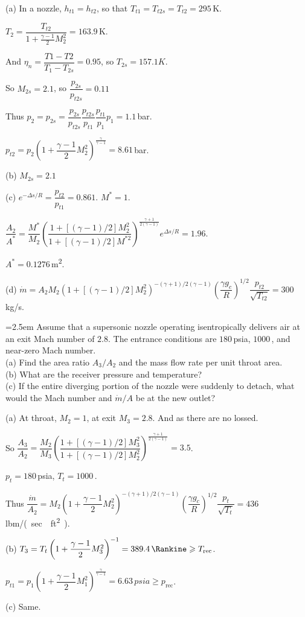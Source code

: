 \documentclass[12pt]{article}
\newlength{\questionlabelwidth}
\newcommand{\question}[2]{%
  \par\noindent
  {\hangindent=2.5em %
   \hangafter=1 %
   \makebox[\questionlabelwidth][l]{\textbf{#1}}#2\par}%
}
\begin{document}
\begin{answerbox}
(a) In a nozzle, $h_{t1}=h_{t2}$, so that $T_{t1}=T_{t2s}=T_{t2}=295$\,\si{K}.

$T_2=\dfrac{T_{t2}}{1+\frac{\gamma -1}{2}M_2^2}=163.9$\,\si{K}.

And $\eta_n=\dfrac{T1-T2}{T_1-T_{2s}}=0.95$, so $T_{2s}=157.1K$.

So $M_{2s}=2.1$, so $\dfrac{p_{2s}}{p_{t2s}}=0.11$

Thus $p_2=p_{2s}=\dfrac{p_{2s}}{p_{t2s}}\dfrac{p_{t2s}}{p_{t1}}\dfrac{p_{t1}}{p_{1}}p_1=1.1$\,\si{bar}.

$p_{t2}=p_2\left(1+\dfrac{\gamma -1}{2}M_2^2\right)^{\frac{\gamma}{\gamma -1}}=8.61$\,\si{bar}.

(b) $M_{2s}=2.1$

(c) $e^{-\Delta s/R}=\dfrac{p_{t2}}{p_{t1}}=0.861$. $M^{*}=1$.

$\dfrac{A_2}{A^{*}}=\dfrac{M^{*}}{M_2}\left(\dfrac{1+[(\gamma -1)/2]M_2^2}{1+[(\gamma -1)/2]M^{*2}}\right)^{\frac{\gamma+1}{2(\gamma -1)}}e^{\Delta s/R}=1.96$.

$A^{*}=0.1276$\,\si{m^2}.

(d) $\dot{m} = A_2M_2\left(1+[(\gamma -1)/2]M_2^2\right)^{-(\gamma +1)/2(\gamma -1)}\left(\dfrac{\gamma g_c}{R}\right)^{1/2}\dfrac{p_{t2}}{\sqrt{T_{t2}}}=300$\,\si{kg/s}.

\end{answerbox}

\question{5.23}{Assume that a supersonic nozzle operating isentropically delivers air at an exit Mach number of $2.8$. The entrance conditions are $180$\,\si{psia}, $1000$\,\si{\Rankine}, and near-zero Mach number.\\
(a)	Find the area ratio $A_3/A_2$ and the mass flow rate per unit throat area.\\
(b)	What are the receiver pressure and temperature?\\
(c)	If the entire diverging portion of the nozzle were suddenly to detach, what would the Mach number and $\dot{m}/A$ be at the new outlet?
}

\begin{answerbox}
(a) At throat, $M_2=1$, at exit $M_3=2.8$. And as there are no lossed.

So $\dfrac{A_3}{A_2}=\dfrac{M_2}{M_3}\left(\dfrac{1+[(\gamma -1)/2]M_3^2}{1+[(\gamma -1)/2]M_2^2}\right)^{\frac{\gamma+1}{2(\gamma -1)}}=3.5$.

$p_t=180$\,\si{psia}, $T_t=1000$\,\si{\Rankine}.

Thus $\dfrac{\dot{m}}{A_2} = M_2\left(1+\dfrac{\gamma -1}{2}M_2^2\right)^{-(\gamma +1)/2(\gamma -1)}\left(\dfrac{\gamma g_c}{R}\right)^{1/2}\dfrac{p_t}{\sqrt{T_t}}=436$\,\si{lbm/(sec\cdot ft^2)}.

(b) $T_3=T_t\left(1+\dfrac{\gamma -1}{2}M_3^2\right)^{-1}=389.4\,\si{\Rankine}\geqslant T_{\text{rec}}$.

$p_{t1}=p_1\left(1+\dfrac{\gamma-1}{2}M_1^2\right)^{\frac{\gamma}{\gamma -1}}=6.63\,\si{psia}\geqslant p_{\text{rec}}$.

(c) Same.
\end{answerbox}
\end{document}

